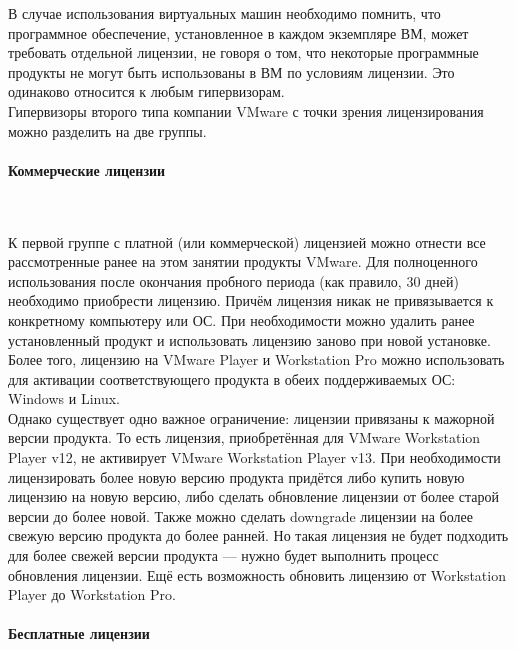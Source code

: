 \documentclass[14pt, a4paper]{article}
\begin{document}
В случае использования виртуальных машин необходимо помнить, что программное обеспечение,
установленное в каждом экземпляре ВМ, может требовать отдельной лицензии, не говоря о том, что
некоторые программные продукты не могут быть использованы в ВМ по условиям лицензии. Это
одинаково относится к любым гипервизорам.\\

Гипервизоры второго типа компании VMware с точки зрения лицензирования можно разделить на две
группы.

\paragraph*{Коммерческие лицензии} \mbox{}\\

К первой группе с платной (или коммерческой) лицензией можно отнести все рассмотренные ранее на
этом занятии продукты VMware. Для полноценного использования после окончания пробного периода
(как правило, 30 дней) необходимо приобрести лицензию. Причём лицензия никак не привязывается к
конкретному компьютеру или ОС. При необходимости можно удалить ранее установленный продукт и
использовать лицензию заново при новой установке. Более того, лицензию на VMware Player и
Workstation Pro можно использовать для активации соответствующего продукта в обеих
поддерживаемых ОС: Windows и Linux.\\

Однако существует одно важное ограничение: лицензии привязаны к мажорной версии продукта. То
есть лицензия, приобретённая для VMware Workstation Player v12, не активирует VMware Workstation
Player v13. При необходимости лицензировать более новую версию продукта придётся либо купить
новую лицензию на новую версию, либо сделать обновление лицензии от более старой версии до
более новой. Также можно сделать downgrade лицензии на более свежую версию продукта до более
ранней. Но такая лицензия не будет подходить для более свежей версии продукта — нужно будет
выполнить процесс обновления лицензии. Ещё есть возможность обновить лицензию от Workstation
Player до Workstation Pro.

\paragraph*{Бесплатные лицензии} \mbox{}\\
\end{document}
